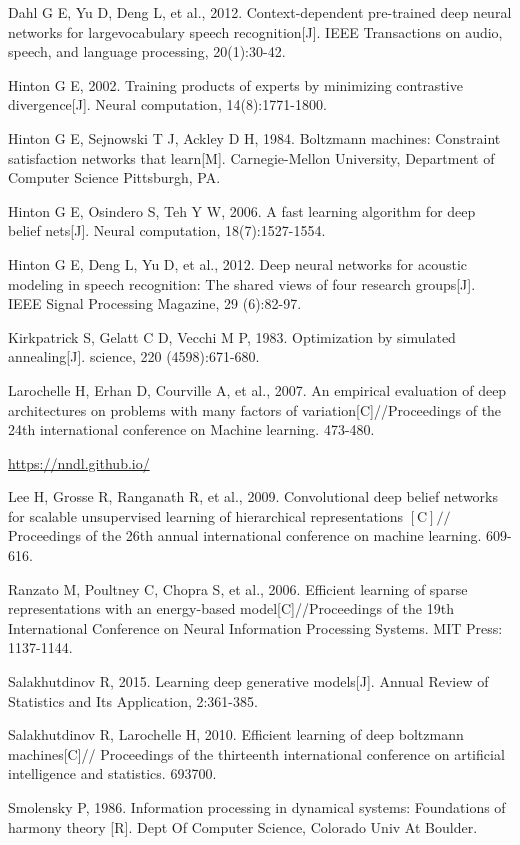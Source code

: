 \documentclass[10pt]{article}
\begin{document}
Dahl G E, Yu D, Deng L, et al., 2012. Context-dependent pre-trained deep neural networks for largevocabulary speech recognition[J]. IEEE Transactions on audio, speech, and language processing, 20(1):30-42.

Hinton G E, 2002. Training products of experts by minimizing contrastive divergence[J]. Neural computation, 14(8):1771-1800.

Hinton G E, Sejnowski T J, Ackley D H, 1984. Boltzmann machines: Constraint satisfaction networks that learn[M]. Carnegie-Mellon University, Department of Computer Science Pittsburgh, PA.

Hinton G E, Osindero S, Teh Y W, 2006. A fast learning algorithm for deep belief nets[J]. Neural computation, 18(7):1527-1554.

Hinton G E, Deng L, Yu D, et al., 2012. Deep neural networks for acoustic modeling in speech recognition: The shared views of four research groups[J]. IEEE Signal Processing Magazine, 29 (6):82-97.

Kirkpatrick S, Gelatt C D, Vecchi M P, 1983. Optimization by simulated annealing[J]. science, 220 (4598):671-680.

Larochelle H, Erhan D, Courville A, et al., 2007. An empirical evaluation of deep architectures on problems with many factors of variation[C]//Proceedings of the 24th international conference on Machine learning. 473-480.

\href{https://nndl.github.io/}{https://nndl.github.io/}

Lee H, Grosse R, Ranganath R, et al., 2009. Convolutional deep belief networks for scalable unsupervised learning of hierarchical representations $[\mathrm{C}] / /$ Proceedings of the 26th annual international conference on machine learning. 609-616.

Ranzato M, Poultney C, Chopra S, et al., 2006. Efficient learning of sparse representations with an energy-based model[C]//Proceedings of the 19th International Conference on Neural Information Processing Systems. MIT Press: 1137-1144.

Salakhutdinov R, 2015. Learning deep generative models[J]. Annual Review of Statistics and Its Application, 2:361-385.

Salakhutdinov R, Larochelle H, 2010. Efficient learning of deep boltzmann machines[C]// Proceedings of the thirteenth international conference on artificial intelligence and statistics. 693700.

Smolensky P, 1986. Information processing in dynamical systems: Foundations of harmony theory [R]. Dept Of Computer Science, Colorado Univ At Boulder.
\end{document}
